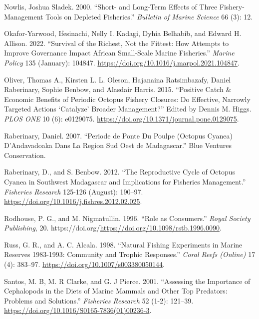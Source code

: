 \documentclass[
]{article}
\newlength{\cslhangindent}
\newlength{\cslentryspacingunit} %
\newenvironment{CSLReferences}[2] %
 {%
  \setlength{\parindent}{0pt}
  \ifodd #1
  \let\oldpar\par
  \def\par{\hangindent=\cslhangindent\oldpar}
  \fi
  \setlength{\parskip}{#2\cslentryspacingunit}
 }%
 {}
\begin{document}
\begin{CSLReferences}{1}{0}
\leavevmode{}%
Nowlis, Joshua Sladek. 2000. {``Short- and Long-Term Effects of Three Fishery-Management Tools on Depleted Fisheries.''} \emph{Bulletin of Marine Science} 66 (3): 12.

\leavevmode{}%
Okafor-Yarwood, Ifesinachi, Nelly I. Kadagi, Dyhia Belhabib, and Edward H. Allison. 2022. {``Survival of the {Richest}, Not the {Fittest}: {How} Attempts to Improve Governance Impact {African} Small-Scale Marine Fisheries.''} \emph{Marine Policy} 135 (January): 104847. \url{https://doi.org/10.1016/j.marpol.2021.104847}.

\leavevmode{}%
Oliver, Thomas A., Kirsten L. L. Oleson, Hajanaina Ratsimbazafy, Daniel Raberinary, Sophie Benbow, and Alasdair Harris. 2015. {``Positive {Catch} \& {Economic} {Benefits} of {Periodic} {Octopus} {Fishery} {Closures}: {Do} {Effective}, {Narrowly} {Targeted} {Actions} {`{Catalyze}'} {Broader} {Management}?''} Edited by Dennis M. Higgs. \emph{PLOS ONE} 10 (6): e0129075. \url{https://doi.org/10.1371/journal.pone.0129075}.

\leavevmode{}%
Raberinary, Daniel. 2007. {``Periode de Ponte Du Poulpe ({Octopus} Cyanea) {D}'{Andavadoaka} Dans La Region Sud Oest de {Madagascar}.''} Blue Ventures Conservation.

\leavevmode{}%
Raberinary, D., and S. Benbow. 2012. {``The Reproductive Cycle of {Octopus} Cyanea in Southwest {Madagascar} and Implications for Fisheries Management.''} \emph{Fisheries Research} 125-126 (August): 190--97. \url{https://doi.org/10.1016/j.fishres.2012.02.025}.

\leavevmode{}%
Rodhouse, P. G., and M. Nigmatullin. 1996. {``Role as Consumers.''} \emph{Royal Society Publishing}, 20. https://doi.org/\url{https://doi.org/10.1098/rstb.1996.0090}.

\leavevmode{}%
Russ, G. R., and A. C. Alcala. 1998. {``Natural Fishing Experiments in Marine Reserves 1983-1993: Community and Trophic Responses.''} \emph{Coral Reefs (Online)} 17 (4): 383--97. \url{https://doi.org/10.1007/s003380050144}.

\leavevmode{}%
Santos, M. B, M. R Clarke, and G. J Pierce. 2001. {``Assessing the Importance of Cephalopods in the Diets of Marine Mammals and Other Top Predators: Problems and Solutions.''} \emph{Fisheries Research} 52 (1-2): 121--39. \url{https://doi.org/10.1016/S0165-7836(01)00236-3}.


\end{CSLReferences}
\end{document}
